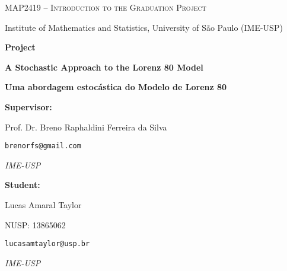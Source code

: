 \documentclass[12pt]{article}
\begin{document}
\begin{titlepage}
	\centering
	{\Large\scshape MAP2419 -- Introduction to the Graduation Project \par}
	\vspace{0.3cm}
	{\large Institute of Mathematics and Statistics, University of São Paulo (IME-USP)\par}
		    
	\vspace{3cm}
		    
	{\LARGE\bfseries Project\par}
	\vspace{1cm}
	{\LARGE\bfseries A Stochastic Approach to the Lorenz 80 Model\par}
	\vspace{0.5em}
	{\large\bfseries Uma abordagem estocástica do Modelo de Lorenz 80\par}
		
	\vfill
		    
	\begin{minipage}[t]{0.45\textwidth}
		\raggedright
		\textbf{Supervisor:} \par
		Prof. Dr. Breno Raphaldini Ferreira da Silva \par
		\texttt{brenorfs@gmail.com} \par
		\textit{IME-USP} \par\medskip
	\end{minipage}
	\hfill
	\begin{minipage}[t]{0.45\textwidth}
		\raggedright
		\textbf{Student:} \par
		Lucas Amaral Taylor \par
		NUSP: 13865062 \par
		\texttt{lucasamtaylor@usp.br} \par
		\textit{IME-USP}
	\end{minipage}
	\vspace{2cm}
\end{titlepage}

\newpage

\begin{abstract}
	This project presents a study of the Lorenz 80 Model, originally proposed by Edward Lorenz (1980), from a stochastic approach inspired by \citet{Chekroun2021}. Essential theoretical foundations are covered, such as the Mori-Zwanzig formalism, general properties of stochastic differential equations and the mathematical and physical characteristics of the model itself. The computational development includes the implementation and numerical simulation of the model using the \textit{Julia} and \textit{Python} languages, with an emphasis on scientific libraries aimed at stochastic dynamic systems and data analysis. Finally, an exploratory analysis of different configurations of the noise term is carried out, with the aim of investigating alternative and complementary approaches to the original treatment.
\end{abstract}
\end{document}
